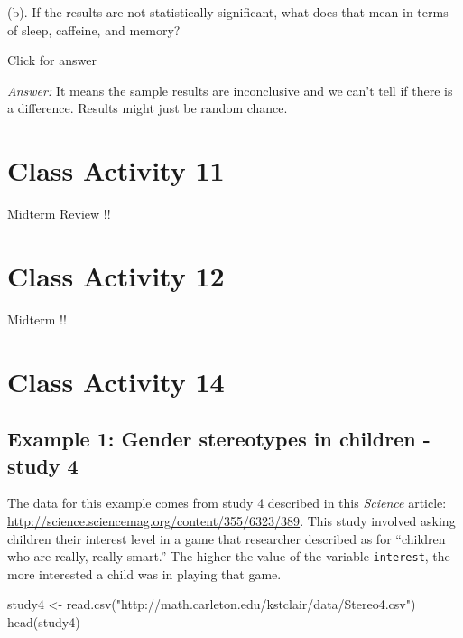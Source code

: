 \documentclass[
]{book}
\newenvironment{Shaded}{\begin{snugshade}}{\end{snugshade}}
\newcommand{\FunctionTok}[1]{\textcolor[rgb]{0.00,0.00,0.00}{#1}}
\newcommand{\NormalTok}[1]{#1}
\newcommand{\OtherTok}[1]{\textcolor[rgb]{0.56,0.35,0.01}{#1}}
\newcommand{\StringTok}[1]{\textcolor[rgb]{0.31,0.60,0.02}{#1}}
\begin{document}
(b). If the results are not statistically significant, what does that mean in terms of sleep, caffeine, and memory?

Click for answer

\emph{Answer:} It means the sample results are inconclusive and we can't tell if there is a difference. Results might just be random chance.

\hypertarget{class-activity-11}{%
\chapter{Class Activity 11}\label{class-activity-11}}

Midterm Review !!

\hypertarget{class-activity-12}{%
\chapter{Class Activity 12}\label{class-activity-12}}

Midterm !!

\hypertarget{class-activity-14}{%
\chapter{Class Activity 14}\label{class-activity-14}}

\hypertarget{example-1-gender-stereotypes-in-children---study-4}{%
\section{Example 1: Gender stereotypes in children - study 4}\label{example-1-gender-stereotypes-in-children---study-4}}

The data for this example comes from study 4 described in this \emph{Science} article: \url{http://science.sciencemag.org/content/355/6323/389}. This study involved asking children their interest level in a game that researcher described as for ``children who are really, really smart.'' The higher the value of the variable \texttt{interest}, the more interested a child was in playing that game.

\begin{Shaded}
\begin{Highlighting}[]
\NormalTok{study4 }\OtherTok{\textless{}{-}} \FunctionTok{read.csv}\NormalTok{(}\StringTok{"http://math.carleton.edu/kstclair/data/Stereo4.csv"}\NormalTok{)}
\FunctionTok{head}\NormalTok{(study4)}
\end{Highlighting}
\end{Shaded}
\end{document}

